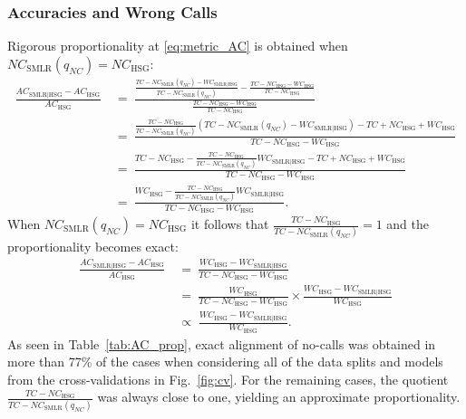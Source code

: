 \documentclass[preprint,5p,times,11pt]{elsarticle}
\begin{document}
\subsubsection*{Accuracies and Wrong Calls}
Rigorous proportionality at \eqref{eq:metric_AC} is obtained when $NC_{\text{SMLR}}(q_{NC}) = NC_{\text{HSG}}$:
\begin{align*}
\frac{AC_{\text{SMLR}\mid\text{HSG}} - AC_{\text{HSG}}}{AC_{\text{HSG}}}
\ &= \ 
\frac{\frac{TC - NC_{\text{SMLR}}(q_{NC}) - WC_{\text{SMLR}\mid\text{HSG}}}{TC - NC_{\text{SMLR}}(q_{NC})} - \frac{TC - NC_{\text{HSG}} - WC_{\text{HSG}}}{TC - NC_{\text{HSG}}}}{\frac{TC - NC_{\text{HSG}} - WC_{\text{HSG}}}{TC - NC_{\text{HSG}}}} \\
\ &= \ 
\frac{\frac{TC - NC_{\text{HSG}}}{TC - NC_{\text{SMLR}}(q_{NC})} \left(TC - NC_{\text{SMLR}}(q_{NC}) - WC_{\text{SMLR}\mid\text{HSG}}\right) - TC + NC_{\text{HSG}} + WC_{\text{HSG}}}{TC - NC_{\text{HSG}} - WC_{\text{HSG}}} \\
\ &= \ 
\frac{TC - NC_{\text{HSG}} - \frac{TC - NC_{\text{HSG}}}{TC - NC_{\text{SMLR}}(q_{NC})} WC_{\text{SMLR}\mid\text{HSG}} - TC + NC_{\text{HSG}} + WC_{\text{HSG}}}{TC - NC_{\text{HSG}} - WC_{\text{HSG}}} \\
\ &= \ 
\frac{WC_{\text{HSG}} - \frac{TC - NC_{\text{HSG}}}{TC - NC_{\text{SMLR}}(q_{NC})} WC_{\text{SMLR}\mid\text{HSG}}}{TC - NC_{\text{HSG}} - WC_{\text{HSG}}}.
\end{align*}
When $NC_{\text{SMLR}}(q_{NC}) = NC_{\text{HSG}}$ it follows that $\frac{TC - NC_{\text{HSG}}}{TC - NC_{\text{SMLR}}(q_{NC})} = 1$ and the proportionality becomes exact:
\begin{align}
\frac{AC_{\text{SMLR}\mid\text{HSG}} - AC_{\text{HSG}}}{AC_{\text{HSG}}}
\ &= \ 
\frac{WC_{\text{HSG}} - WC_{\text{SMLR}\mid\text{HSG}}}{TC - NC_{\text{HSG}} - WC_{\text{HSG}}} \nonumber\\
\ &= \ 
\frac{WC_{\text{HSG}}}{TC - NC_{\text{HSG}} - WC_{\text{HSG}}} \times \frac{WC_{\text{HSG}} - WC_{\text{SMLR}\mid\text{HSG}}}{WC_{\text{HSG}}} \nonumber\\
\; &\propto \; 
\frac{WC_{\text{HSG}} - WC_{\text{SMLR}\mid\text{HSG}}}{WC_{\text{HSG}}}.\label{eq:prop_AC}
\end{align}
As seen in Table~\ref{tab:AC_prop}, exact alignment of no-calls was obtained in more than 77\% of the cases when considering all of the data splits and models from the cross-validations in Fig.~\ref{fig:cv}.
For the remaining cases, the quotient $\frac{TC - NC_{\text{HSG}}}{TC - NC_{\text{SMLR}}(q_{NC})}$ was always close to one, yielding an approximate proportionality.
\end{document}
